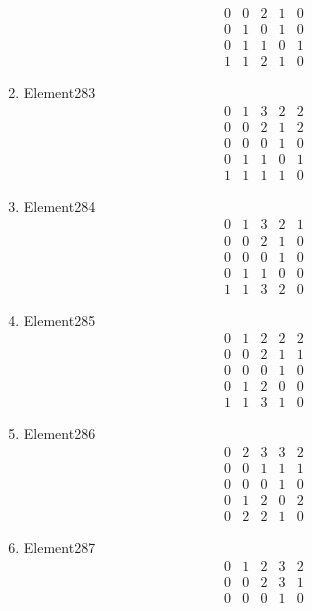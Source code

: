 \documentclass[12pt]{article}
\begin{document}
\begin{multicols}{3}
\begin{enumerate}
\begin{equation*}
\begin{array}{ccccc}
0&0&2&1&0\\
0&1&0&1&0\\
0&1&1&0&1\\
1&1&2&1&0
\end{array}
\end{equation*}
\item Element283
\begin{equation*}
\begin{array}{ccccc}
0&1&3&2&2\\
0&0&2&1&2\\
0&0&0&1&0\\
0&1&1&0&1\\
1&1&1&1&0
\end{array}
\end{equation*}
\item Element284
\begin{equation*}
\begin{array}{ccccc}
0&1&3&2&1\\
0&0&2&1&0\\
0&0&0&1&0\\
0&1&1&0&0\\
1&1&3&2&0
\end{array}
\end{equation*}
\item Element285
\begin{equation*}
\begin{array}{ccccc}
0&1&2&2&2\\
0&0&2&1&1\\
0&0&0&1&0\\
0&1&2&0&0\\
1&1&3&1&0
\end{array}
\end{equation*}
\item Element286
\begin{equation*}
\begin{array}{ccccc}
0&2&3&3&2\\
0&0&1&1&1\\
0&0&0&1&0\\
0&1&2&0&2\\
0&2&2&1&0
\end{array}
\end{equation*}
\item Element287
\begin{equation*}
\begin{array}{ccccc}
0&1&2&3&2\\
0&0&2&3&1\\
0&0&0&1&0\\

\end{array}
\end{equation*}
\end{enumerate}
\end{multicols}
\end{document}
